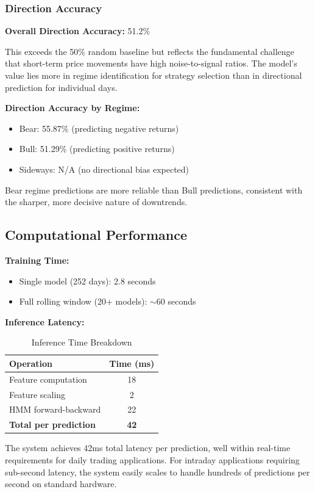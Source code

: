 \documentclass[conference]{IEEEtran}
\begin{document}
\subsubsection{Direction Accuracy}
\textbf{Overall Direction Accuracy:} 51.2\%

This exceeds the 50\% random baseline but reflects the fundamental challenge that short-term price movements have high noise-to-signal ratios. The model's value lies more in regime identification for strategy selection than in directional prediction for individual days.

\textbf{Direction Accuracy by Regime:}
\begin{itemize}
\item Bear: 55.87\% (predicting negative returns)
\item Bull: 51.29\% (predicting positive returns)
\item Sideways: N/A (no directional bias expected)
\end{itemize}

Bear regime predictions are more reliable than Bull predictions, consistent with the sharper, more decisive nature of downtrends.

\subsection{Computational Performance}

\textbf{Training Time:}
\begin{itemize}
\item Single model (252 days): 2.8 seconds
\item Full rolling window (20+ models): $\sim$60 seconds
\end{itemize}

\textbf{Inference Latency:}
\begin{table}[htbp]
\centering
\caption{Inference Time Breakdown}
\label{tab:inference_time}
\begin{tabular}{lc}
\toprule
\textbf{Operation} & \textbf{Time (ms)} \\
\midrule
Feature computation & 18 \\
Feature scaling & 2 \\
HMM forward-backward & 22 \\
\textbf{Total per prediction} & \textbf{42} \\
\bottomrule
\end{tabular}
\end{table}

The system achieves 42ms total latency per prediction, well within real-time requirements for daily trading applications. For intraday applications requiring sub-second latency, the system easily scales to handle hundreds of predictions per second on standard hardware.
\end{document}
